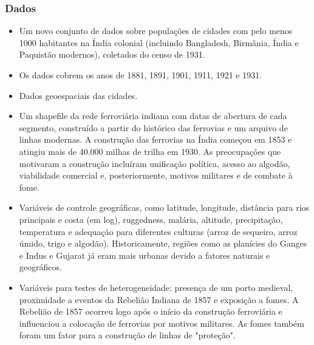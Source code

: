 \documentclass[12pt]{article}
\begin{document}
\subsubsection*{Dados}
\begin{itemize}
    \item Um novo conjunto de dados sobre populações de cidades com pelo menos 1000 habitantes na Índia colonial (incluindo Bangladesh, Birmânia, Índia e Paquistão modernos), coletados do censo de 1931.
    \item Os dados cobrem os anos de 1881, 1891, 1901, 1911, 1921 e 1931.
    \item Dados geoespaciais das cidades.
    \item Um shapefile da rede ferroviária indiana com datas de abertura de cada segmento, construído a partir do histórico das ferrovias e um arquivo de linhas modernas. A construção das ferrovias na Índia começou em 1853 e atingiu mais de 40.000 milhas de trilha em 1930. As preocupações que motivaram a construção incluíram unificação política, acesso ao algodão, viabilidade comercial e, posteriormente, motivos militares e de combate à fome.
    \item Variáveis de controle geográficas, como latitude, longitude, distância para rios principais e costa (em log), ruggedness, malária, altitude, precipitação, temperatura e adequação para diferentes culturas (arroz de sequeiro, arroz úmido, trigo e algodão). Historicamente, regiões como as planícies do Ganges e Indus e Gujarat já eram mais urbanas devido a fatores naturais e geográficos.
    \item Variáveis para testes de heterogeneidade: presença de um porto medieval, proximidade a eventos da Rebelião Indiana de 1857 e exposição a fomes. A Rebelião de 1857 ocorreu logo após o início da construção ferroviária e influenciou a colocação de ferrovias por motivos militares. As fomes também foram um fator para a construção de linhas de "proteção".
\end{itemize}
\end{document}
